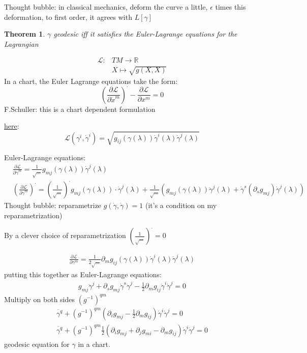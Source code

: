 \documentclass[10pt, twoside]{amsart}
\newtheorem{theorem}{Theorem}
\begin{document}
\begin{multicols*}{2}
Thought bubble: in classical mechanics, deform the curve a little, $\epsilon$ times this deformation, to first order, it agrees with $L[\gamma]$

\begin{theorem}
  $\gamma$ geodesic iff it satisfies the Euler-Lagrange equations for the Lagrangian
\end{theorem}

\[
\begin{aligned}
\mathcal{L}:& TM \to \mathbb{R} \\
& X \mapsto \sqrt{g(X,X)} \end{aligned}
\]
In a chart, the Euler Lagrange equations take the form:
\[
 \left( \frac{ \partial \mathcal{L}}{  \partial \dot{x}^m } \right)^{\cdot} - \frac{ \partial \mathcal{L}}{ \partial x^m} = 0 
\]
F.Schuller: this is a chart dependent formulation

\underline{here}: 
\[
\mathcal{L}(\gamma^i , \dot{\gamma}^i ) = \sqrt{ g_{ij}(\gamma(\lambda)) \dot{\gamma}^i(\lambda) \dot{\gamma}^j(\lambda)}
\]

Euler-Lagrange equations:
\[
\begin{aligned}
  & \frac{ \partial \mathcal{L}}{ \partial \dot{\gamma}^m } = \frac{1}{ \sqrt{  \dots } } g_{mj}(\gamma(\lambda)) \dot{\gamma}^j(\lambda) \\ 
  & \left( \frac{ \partial \mathcal{L}}{ \partial \dot{\gamma}^m } \right)^{\cdot} = \left( \frac{1}{ \sqrt{ \dots } } \right)^{\cdot} g_{mj}(\gamma(\lambda)) \cdot \dot{\gamma}^j(\lambda) + \frac{1}{\sqrt{ \dots }} \left( g_{mj}(\gamma(\lambda)) \ddot{\gamma}^j(\lambda) + \dot{\gamma}^s(\partial_s g_{mj}) \dot{\gamma}^j(\lambda) \right)
\end{aligned}
\]
Thought bubble: reparametrize $g(\dot{\gamma}, \dot{\gamma})=1$ (it's a condition on my reparametrization)

By a clever choice of reparametrization $( \frac{1}{\sqrt{ \dots }} )^{\cdot} =0$

\[
\begin{gathered}
  \frac{ \partial \mathcal{L}}{ \partial \gamma^m} = \frac{1}{ 2\sqrt{ \dots }} \partial_m g_{ij}(\gamma(\lambda)) \dot{\gamma}^i(\lambda) \dot{\gamma}^j(\lambda)
\end{gathered}
\]
putting this together as Euler-Lagrange equations:
\[
\begin{gathered}
g_{mj} \ddot{\gamma}^j +   \partial_s g_{mj} \dot{\gamma}^s \dot{\gamma}^j - \frac{1}{2} \partial_m g_{ij} \dot{\gamma}^i \dot{\gamma}^j = 0 
\end{gathered}
\]
Multiply on both sides $(g^{-1})^{qm}$
\[
\begin{gathered}
\ddot{\gamma^q} + (g^{-1})^{qm}(\partial_i g_{mj} - \frac{1}{2} \partial_m g_{ij} ) \dot{\gamma}^i \dot{\gamma}^j = 0  \\ 
\boxed{ \ddot{\gamma^q} + (g^{-1})^{qm}\frac{1}{2} (\partial_i g_{mj} + \partial_j g_{mi} -  \partial_m g_{ij} ) \dot{\gamma}^i \dot{\gamma}^j = 0 }
\end{gathered}
\]
geodesic equation for $\gamma$ in a chart.  


\end{multicols*}
\end{document}
